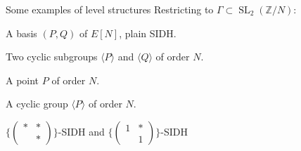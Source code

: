 \documentclass[aspectratio=169]{beamer}
\newcommand{\SL}{\operatorname{SL}}
\begin{document}
\begin{frame}{Some examples of level structures}
  \large
  Restricting to $Γ ⊂ \SL_2(ℤ/N)$:
  \bigskip
  \begin{description}
    \setlength{\itemsep}{1em}
  \item[$Γ = \{\left(\begin{smallmatrix}1&\\&1\end{smallmatrix}\right)\}$:]
    A basis $(P,Q)$ of $E[N]$, plain SIDH.
  \item[$Γ = \{\left(\begin{smallmatrix}*&\\&*\end{smallmatrix}\right)\}$:] 
    Two cyclic subgroups $〈P〉$ and $〈Q〉$ of order $N$.
  \item[$Γ_1 = \{\left(\begin{smallmatrix}1&*\\&1\end{smallmatrix}\right)\}$:] 
    A point $P$ of order $N$.
  \item[$Γ_0 = \{\left(\begin{smallmatrix}*&*\\&*\end{smallmatrix}\right)\}$:] 
    A cyclic group $〈P〉$ of order $N$.
  \end{description}
\end{frame}


\begin{frame}{$\{\left(\begin{smallmatrix}*&*\\&*\end{smallmatrix}\right)\}$-SIDH and $\{\left(\begin{smallmatrix}1&*\\&1\end{smallmatrix}\right)\}$-SIDH}
  \large\centering
\end{frame}

\end{document}
